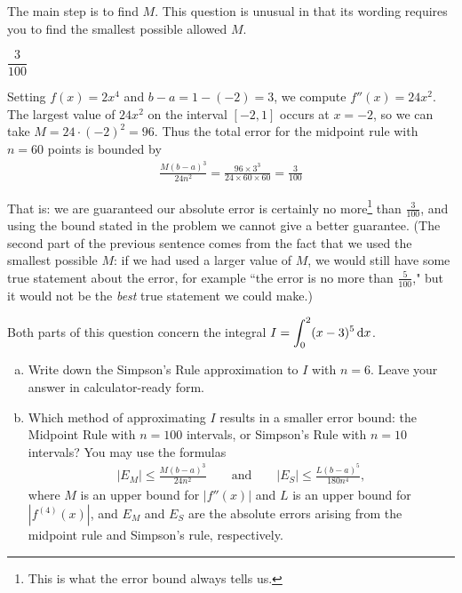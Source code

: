 \begin{hint}
The main step is to find $M$. This question is unusual in that its
wording requires you to find the smallest possible allowed $M$.
\end{hint}

\begin{answer}
$\dfrac{3}{100}$
\end{answer}

\begin{solution}
Setting $f(x) = 2 x^4$ and $b-a = 1-(-2)=3$, we compute $f''(x) = 24x^2$.
The largest value of $24x^2$ on the interval $[-2,1]$ occurs at $x=-2$,
so we can take $M = 24\cdot(-2)^2=96$. Thus the total error for the midpoint rule with $n=60$ points is bounded by
\begin{align*}
\frac{M (b-a)^3}{24n^2}  = \frac{96 \times 3^3}{24 \times 60 \times 60} = \frac{3}{100}
\end{align*}

That is: we are guaranteed our absolute error is certainly no more\footnote{This is what the error bound always tells us.} than $\frac{3}{100}$, and using the bound stated in the problem we cannot give a better guarantee.
(The second part of the previous sentence comes from the fact that we used the smallest possible $M$: if we had used a larger value of $M$, we would still have some true statement about the error, for example ``the error is no more than $\frac{5}{100}$," but it would not be the
\emph{best} true statement we could make.)
\end{solution}

\begin{question}[2016A]
Both parts of this question concern the integral $I = \displaystyle\int_{0}^{2} (x-3)^5\,\mathrm{d}x$.
\begin{enumerate}[(a)]
\item
Write down the Simpson's Rule approximation to $I$ with $n=6$.
Leave your answer in calculator-ready form.

\item
Which method of approximating $I$ results in a smaller error bound:
the Midpoint Rule with $n=100$ intervals, or Simpson's Rule with $n=10$
intervals?  You may use the formulas
\begin{align*}
|E_M| \le \frac{M(b-a)^3}{24n^2} \qquad\text{and}\qquad |E_S| \le \frac{L(b-a)^5}{180n^4},
\end{align*}
where $M$ is an upper bound for $|f''(x)|$ and $L$ is an upper bound for $|f^{(4)}(x)|$, and $E_M$ and $E_S$ are the absolute errors arising from the midpoint rule and Simpson's rule, respectively.
\end{enumerate}
\end{question}

